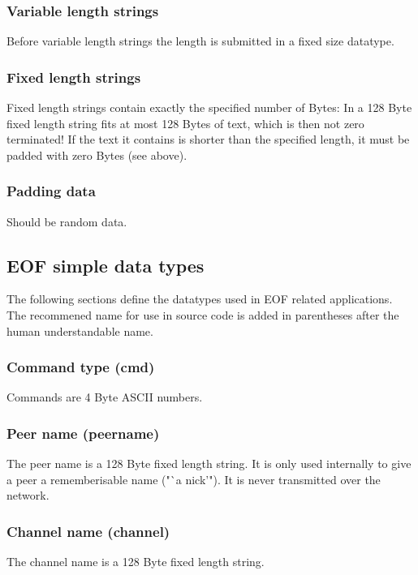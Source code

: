 \documentclass[12pt,a4paper]{article}
\begin{document}
\subsubsection{Variable length strings}
Before variable length strings the length is submitted in a fixed size
datatype.
\subsubsection{Fixed length strings}
Fixed length strings contain exactly the specified number of Bytes:
In a 128 Byte fixed length string fits at most 128 Bytes of text,
which is then not zero terminated!
If the text it contains is shorter than the specified length,
it must be padded with zero Bytes (see above).
\subsubsection{Padding data}
Should be random data.
\subsection{EOF simple data types}
The following sections define the datatypes used in EOF related
applications. The recommened name for use in source
code is added in parentheses after the human understandable name.
\subsubsection{Command type (cmd)}
Commands are 4 Byte ASCII numbers.
\subsubsection{Peer name (peername)}
The peer name is a 128 Byte fixed length string. It is only
used internally to give a peer a rememberisable name ("`a nick'").
It is never transmitted over the network.
\subsubsection{Channel name (channel)}
The channel name is a 128 Byte fixed length string.
\end{document}
